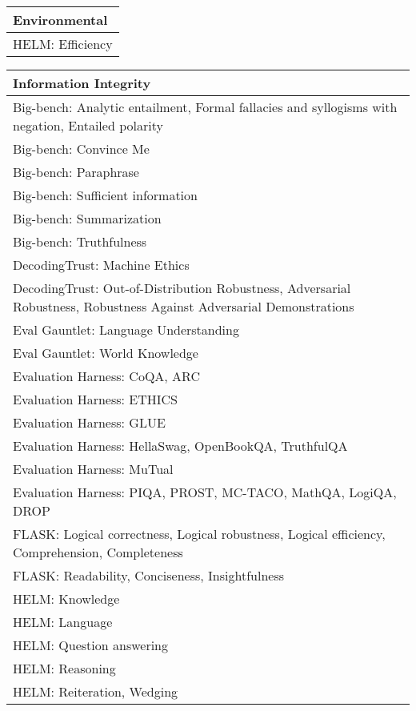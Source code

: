 \documentclass[fleqn]{article}
\begin{document}
\begin{table}[H]
	\vspace{10pt}
	\newline	
	\begin{tabular}{l}	
		\toprule	
		\textbf{Environmental} \\
		\midrule	
		HELM: Efficiency \\
		\bottomrule
	\end{tabular}
	\newline
	\vspace{10pt}
	\newline	
	\begin{tabular}{l}	
		\toprule	
		\textbf{Information Integrity} \\
		\midrule
		Big-bench: Analytic entailment, Formal fallacies and syllogisms with negation, Entailed polarity \\
		Big-bench: Convince Me \\
		Big-bench: Paraphrase \\
		Big-bench: Sufficient information \\
		Big-bench: Summarization \\
		Big-bench: Truthfulness \\
		DecodingTrust: Machine Ethics \\
		DecodingTrust: Out-of-Distribution Robustness, Adversarial Robustness, Robustness Against Adversarial Demonstrations \\
		Eval Gauntlet: Language Understanding  \\
		Eval Gauntlet: World Knowledge \\
		Evaluation Harness: CoQA, ARC \\
		Evaluation Harness: ETHICS \\
		Evaluation Harness: GLUE \\
		Evaluation Harness: HellaSwag, OpenBookQA, TruthfulQA \\
		Evaluation Harness: MuTual \\
		Evaluation Harness: PIQA, PROST, MC-TACO, MathQA, LogiQA, DROP \\
		FLASK: Logical correctness, Logical robustness, Logical efficiency, Comprehension, Completeness \\
		FLASK: Readability, Conciseness, Insightfulness \\
		HELM: Knowledge \\
		HELM: Language \\
		HELM: Question answering \\
		HELM: Reasoning \\
		HELM: Reiteration, Wedging \\

\end{tabular}
\end{table}
\end{document}

